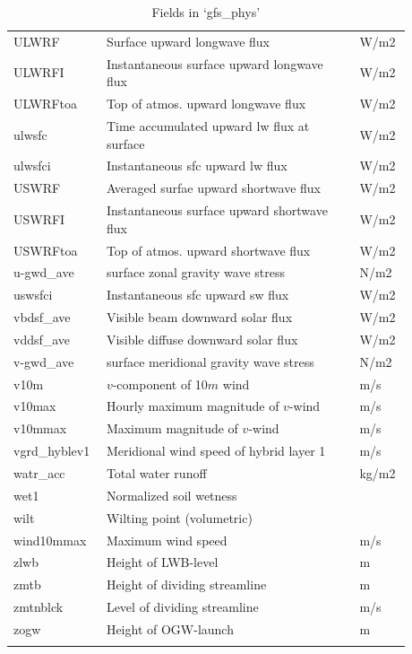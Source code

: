 \documentclass[11pt,fleqn]{report}              %
\begin{document}
\begin{enumerate}
\begin{enumerate}
{\begin{longtable}{p{0.17\linewidth} | p{0.6\linewidth} | p{0.11\linewidth} }
ULWRF  & Surface upward longwave flux & W/m2  \\
ULWRFI  & Instantaneous surface upward longwave flux &W/m2  \\
ULWRFtoa   & Top of atmos. upward longwave flux & W/m2  \\
ulwsfc  & Time accumulated upward lw flux at surface  & W/m2  \\
ulwsfci &  Instantaneous sfc upward lw flux & W/m2 \\
USWRF  & Averaged surfae upward shortwave flux & W/m2  \\
USWRFI  & Instantaneous surface upward shortwave flux & W/m2  \\
USWRFtoa  & Top of atmos. upward shortwave flux & W/m2 \\
u-gwd\_ave  & surface zonal gravity wave stress & N/m2  \\
uswsfci &  Instantaneous sfc upward sw flux & W/m2 \\
vbdsf\_ave  & Visible beam downward solar flux & W/m2  \\
vddsf\_ave  & Visible diffuse downward solar flux & W/m2  \\
v-gwd\_ave  & surface meridional gravity wave stress & N/m2  \\
v10m & $v$-component of 10$m$ wind & m/s \\
v10max  & Hourly maximum magnitude of $v$-wind & m/s \\
v10mmax  & Maximum magnitude of $v$-wind & m/s  \\
vgrd\_hyblev1  & Meridional wind speed of hybrid layer 1 & m/s  \\
watr\_acc  & Total water runoff  & kg/m2 \\
wet1 &  Normalized soil wetness & \\
wilt  & Wilting point (volumetric) &  \\
wind10mmax  & Maximum wind speed & m/s \\
zlwb & Height of LWB-level & m \\
zmtb & Height of dividing streamline & m \\
zmtnblck  & Level of dividing streamline & m/s  \\
zogw & Height of OGW-launch & m \\
\hline
\caption{Fields in `gfs\_phys'}
\label{table:fv3_fld_gfs_phys}
\end{longtable}
}


\end{enumerate}
\end{enumerate}
\end{document}
